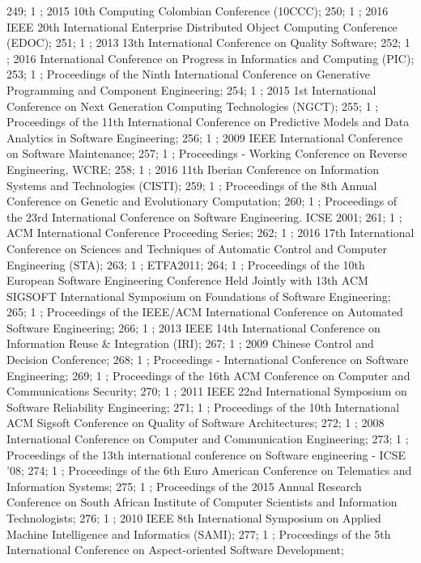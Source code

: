 249; 1 ; 2015 10th Computing Colombian Conference (10CCC); 
250; 1 ; 2016 IEEE 20th International Enterprise Distributed Object Computing Conference (EDOC); 
251; 1 ; 2013 13th International Conference on Quality Software; 
252; 1 ; 2016 International Conference on Progress in Informatics and Computing (PIC); 
253; 1 ; Proceedings of the Ninth International Conference on Generative Programming and Component Engineering; 
254; 1 ; 2015 1st International Conference on Next Generation Computing Technologies (NGCT); 
255; 1 ; Proceedings of the 11th International Conference on Predictive Models and Data Analytics in Software Engineering; 
256; 1 ; 2009 IEEE International Conference on Software Maintenance; 
257; 1 ; Proceedings - Working Conference on Reverse Engineering, WCRE; 
258; 1 ; 2016 11th Iberian Conference on Information Systems and Technologies (CISTI); 
259; 1 ; Proceedings of the 8th Annual Conference on Genetic and Evolutionary Computation; 
260; 1 ; Proceedings of the 23rd International Conference on Software Engineering. ICSE 2001; 
261; 1 ; ACM International Conference Proceeding Series; 
262; 1 ; 2016 17th International Conference on Sciences and Techniques of Automatic Control and Computer Engineering (STA); 
263; 1 ; ETFA2011; 
264; 1 ; Proceedings of the 10th European Software Engineering Conference Held Jointly with 13th ACM SIGSOFT International Symposium on Foundations of Software Engineering; 
265; 1 ; Proceedings of the IEEE/ACM International Conference on Automated Software Engineering; 
266; 1 ; 2013 IEEE 14th International Conference on Information Reuse {\&} Integration (IRI); 
267; 1 ; 2009 Chinese Control and Decision Conference; 
268; 1 ; Proceedings - International Conference on Software Engineering; 
269; 1 ; Proceedings of the 16th ACM Conference on Computer and Communications Security; 
270; 1 ; 2011 IEEE 22nd International Symposium on Software Reliability Engineering; 
271; 1 ; Proceedings of the 10th International ACM Sigsoft Conference on Quality of Software Architectures; 
272; 1 ; 2008 International Conference on Computer and Communication Engineering; 
273; 1 ; Proceedings of the 13th international conference on Software engineering - ICSE '08; 
274; 1 ; Proceedings of the 6th Euro American Conference on Telematics and Information Systems; 
275; 1 ; Proceedings of the 2015 Annual Research Conference on South African Institute of Computer Scientists and Information Technologists; 
276; 1 ; 2010 IEEE 8th International Symposium on Applied Machine Intelligence and Informatics (SAMI); 
277; 1 ; Proceedings of the 5th International Conference on Aspect-oriented Software Development; 

